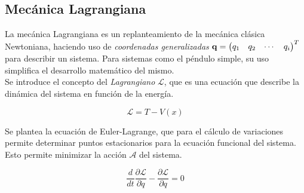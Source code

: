 \subsection{Mecánica Lagrangiana}

La mecánica Lagrangiana es un replanteamiento de la 
mecánica clásica Newtoniana, haciendo uso
de \emph{coordenadas generalizadas}
$\bold{q} = 
\begin{pmatrix}
q_1 & q_2 &\cdots & q_i
\end{pmatrix}^T
$ para describir un sistema.
Para sistemas como el péndulo simple, su uso simplifica el
desarrollo matemático del mismo.\\

Se introduce el concepto del \emph{Lagrangiano} $\mathcal{L}$,
que es una ecuación que describe la dinámica del sistema en 
función de la energía.

\begin{equation}
 \mathcal{L} = T - V(x)
 \label{eq: lagrangian}
\end{equation}

Se plantea la ecuación de Euler-Lagrange, 
que para el cálculo de variaciones permite determinar
puntos estacionarios para la ecuación funcional del sistema.
Esto permite minimizar la acción $\mathcal{A}$ del sistema.

\begin{equation}
 \dfrac{d}{dt} \dfrac{\partial \mathcal{L}}{\partial \dot{q}} - 
 \dfrac{\partial \mathcal{L}}{\partial q} = 0
 \label{eq: euler lagrange equation}
\end{equation}




